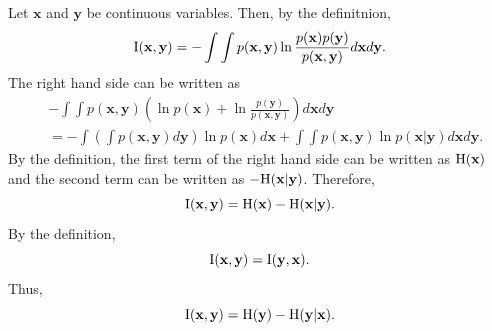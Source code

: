 \subsection{}
\label{1.41}
Let $\mathbf{x}$ and $\mathbf{y}$ be continuous variables.
Then, by the definitnion,
%
\begin{equation}
{\rm I}(\mathbf{x}, \mathbf{y}) 
= 
- 
\int 
\int 
p(\mathbf{x}, \mathbf{y}) 
\ln 
\frac{p(\mathbf{x}) p(\mathbf{y})}{p(\mathbf{x}, \mathbf{y})} 
d\mathbf{x} d\mathbf{y}.
\end{equation}
%
The right hand side can be written as
%
\begin{equation}
\begin{aligned}
&
- 
\int 
\int 
p(\mathbf{x}, \mathbf{y}) 
\left( 
	\ln p(\mathbf{x}) 
	+ 
	\ln \frac{p(\mathbf{y})}{p(\mathbf{x}, \mathbf{y})} 
\right) 
d\mathbf{x} 
d\mathbf{y} \\
&= 
- 
\int 
\left( 
	\int 
	p(\mathbf{x}, \mathbf{y}) 
	d\mathbf{y} 
\right) 
\ln p(\mathbf{x}) 
d\mathbf{x} 
+ 
\int 
\int 
p(\mathbf{x}, \mathbf{y}) 
\ln p(\mathbf{x} | \mathbf{y}) 
d\mathbf{x} 
d\mathbf{y}.
\end{aligned}
\end{equation}
%
By the definition, the first term of the right hand side can be written as ${\rm H}(\mathbf{x})$ and the second term can be written as $- {\rm H(\mathbf{x} | \mathbf{y})}$.
Therefore,
%
\begin{equation}
{\rm I}(\mathbf{x}, \mathbf{y}) 
= 
{\rm H}(\mathbf{x}) 
- 
{\rm H(\mathbf{x} | \mathbf{y})}.
\end{equation}
%
By the definition,
%
\begin{equation}
{\rm I}(\mathbf{x}, \mathbf{y}) 
= 
{\rm I}(\mathbf{y}, \mathbf{x}).
\end{equation}
%
Thus,
%
\begin{equation}
{\rm I}(\mathbf{x}, \mathbf{y}) 
= 
{\rm H}(\mathbf{y}) 
- 
{\rm H(\mathbf{y} | \mathbf{x})}.
\end{equation}
%

